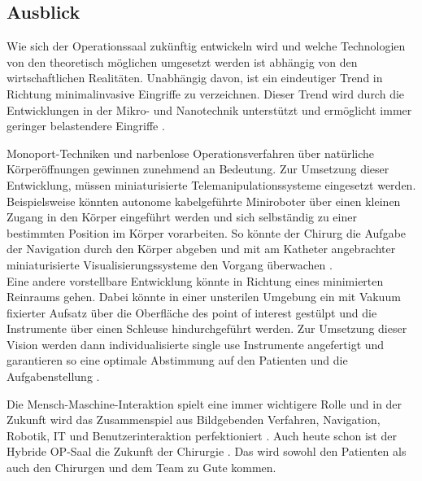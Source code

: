 \subsection{Ausblick}
Wie sich der Operationssaal zukünftig entwickeln wird und welche Technologien von den theoretisch möglichen umgesetzt werden ist abhängig von den wirtschaftlichen Realitäten. Unabhängig davon, ist ein eindeutiger Trend in Richtung minimalinvasive Eingriffe zu verzeichnen. Dieser Trend wird durch die Entwicklungen in der Mikro- und Nanotechnik unterstützt und ermöglicht immer geringer belastendere Eingriffe \cite{DerDigitaleOperationssaal}. 

Monoport-Techniken und narbenlose Operationsverfahren über natürliche Körperöffnungen gewinnen zunehmend an Bedeutung. Zur Umsetzung dieser Entwicklung, müssen miniaturisierte Telemanipulationssysteme eingesetzt werden. Beispielsweise könnten autonome kabelgeführte Miniroboter über einen kleinen Zugang in den Körper eingeführt werden und sich selbständig zu einer bestimmten Position im Körper vorarbeiten. So könnte der Chirurg die Aufgabe der Navigation durch den Körper abgeben und mit am Katheter angebrachter miniaturisierte Visualisierungssysteme den Vorgang überwachen \cite{DerDigitaleOperationssaal}.\\
Eine andere vorstellbare Entwicklung könnte in Richtung eines minimierten Reinraums gehen. Dabei könnte in einer unsterilen Umgebung ein mit Vakuum fixierter Aufsatz über die Oberfläche des \glqq point of interest\grqq{} gestülpt und die Instrumente über einen Schleuse hindurchgeführt werden. Zur Umsetzung dieser Vision werden dann individualisierte \glqq single use\grqq{} Instrumente angefertigt und garantieren so eine optimale Abstimmung auf den Patienten und die Aufgabenstellung \cite{DerDigitaleOperationssaal}.

Die Mensch-Maschine-Interaktion spielt eine immer wichtigere Rolle und in der Zukunft wird das Zusammenspiel aus Bildgebenden Verfahren, Navigation, Robotik, IT und Benutzerinteraktion perfektioniert \cite{CurrentAndFuture}.
Auch heute schon ist der Hybride OP-Saal die Zukunft der Chirurgie \cite{Maquet}. Das wird sowohl den Patienten als auch den Chirurgen und dem Team zu Gute kommen.


	
	



